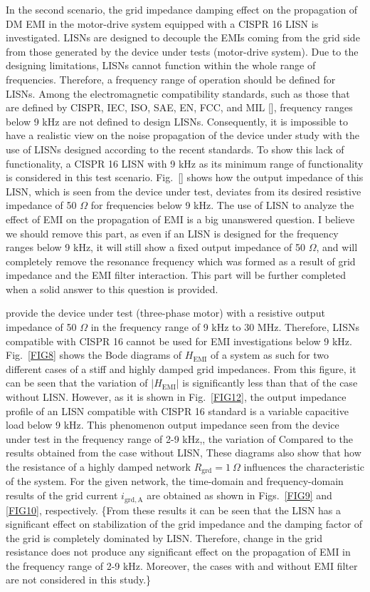 \documentclass[journal,a4paper,10pt,twoside]{IEEEtran} %
\begin{document}
    In the second scenario, the grid impedance damping effect on the propagation of DM EMI in the motor-drive system equipped with a CISPR 16 LISN is investigated. LISNs are designed to decouple the EMIs coming from the grid side from those generated by the device under tests (motor-drive system). Due to the designing limitations, LISNs cannot function within the whole range of frequencies. Therefore, a frequency range of operation should be defined for LISNs. Among the electromagnetic compatibility standards, such as those that are defined by CISPR, IEC, ISO, SAE, EN, FCC, and MIL [], frequency ranges below 9 kHz are not defined to design LISNs. Consequently, it is impossible to have a realistic view on the noise propagation of the device under study with the use of LISNs designed according to the recent standards. To show this lack of functionality, a CISPR 16 LISN with 9 kHz as its minimum range of functionality is considered in this test scenario. Fig.~\ref{} shows how the output impedance of this LISN, which is seen from the device under test, deviates from its desired resistive impedance of 50 $\Omega$ for frequencies below 9 kHz.
    {\color{red} The use of LISN to analyze the effect of EMI on the propagation of EMI is a big unanswered question. I believe we should remove this part, as even if an LISN is designed for the frequency ranges below 9 kHz, it will still show a fixed output impedance of 50 $\Omega$, and will completely remove the resonance frequency which was formed as a result of grid impedance and the EMI filter interaction. This part will be further completed when a solid answer to this question is provided.}
    
    provide the device under test (three-phase motor) with a resistive output impedance of 50 $\Omega$ in the frequency range of 9 kHz to 30 MHz. Therefore, LISNs compatible with CISPR 16 cannot be used for EMI investigations below 9 kHz. Fig.~\ref{FIG8} shows the Bode diagrams of $H_\mathrm{EMI}$ of a system as such for two different cases of a stiff and highly damped grid impedances. From this figure, it can be seen that the variation of $|H_\mathrm{EMI}|$ is significantly less than that of the case without LISN. However, as it is shown in Fig.~\ref{FIG12}, the output impedance profile of an LISN compatible with CISPR 16 standard is a variable capacitive load below  9 kHz. This phenomenon output impedance seen from the device under test in the frequency range of 2-9 kHz,, the variation of Compared to the results obtained from the case without LISN, These diagrams also show that how the resistance of a highly damped network $R_\mathrm{grd}=1~\Omega$ influences the characteristic of the system. For the given network, the time-domain and frequency-domain results of the grid current $i_\mathrm{grd,A}$ are obtained as shown in Figs.~\ref{FIG9} and \ref{FIG10}, respectively. {\color{red} \{From these results it can be seen that the LISN has a significant effect on stabilization of the grid impedance and the damping factor of the grid is completely dominated by LISN. Therefore, change in the grid resistance does not produce any significant effect on the propagation of EMI in the frequency range of 2-9 kHz. Moreover, the cases with and without EMI filter are not considered in this study.\}}
    
\end{document}
